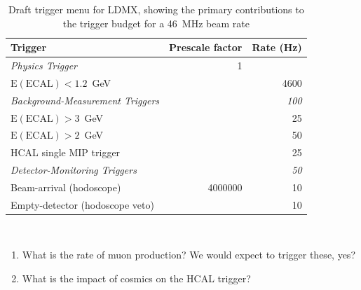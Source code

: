 \begin{table}
  \caption{Draft trigger menu for LDMX, showing the primary
    contributions to the trigger budget for a 46~MHz beam
    rate}\label{tab:trigger_menu}
  \begin{tabular}{|l|r|r|} \hline
    Trigger & Prescale factor & Rate (Hz) \\
    \hline
    \em{Physics Trigger} & 1 & \\ 
    \hspace{0.2in} $\mathrm{E(ECAL)}<1.2$~GeV & & 4600 \\ \hline
    \em{Background-Measurement Triggers} &  & \em{100} \\
    \hspace{0.2in} $\mathrm{E(ECAL)}>3$~GeV & & 25 \\
    \hspace{0.2in} $\mathrm{E(ECAL)}>2$~GeV & & 50 \\
    \hspace{0.2in} HCAL single MIP trigger & & 25 \\ \hline
    \em{Detector-Monitoring Triggers} &  & \em{50} \\
    \hspace{0.2in} Beam-arrival (hodoscope) & 4000000 & 10 \\
    \hspace{0.2in} Empty-detector (hodoscope veto) & & 10 \\
    \hline
  \end{tabular}
  \\
\end{table}


\begin{enumerate}
\item What is the rate of muon production?  We would expect to trigger these, yes?
\item What is the impact of cosmics on the HCAL trigger?
\end{enumerate}
